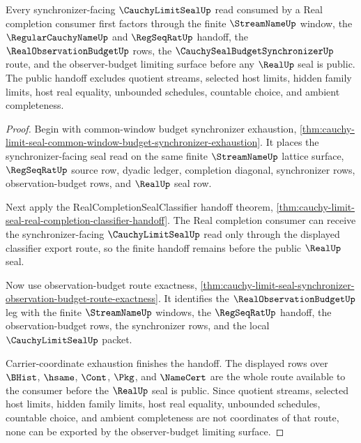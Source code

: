 \begin{theorem}
\label{thm:cauchy-limit-seal-observer-budget-handoff}
Every synchronizer-facing $\CauchyLimitSealUp$ read consumed by a Real completion consumer first factors through the finite $\StreamNameUp$ window, the $\RegularCauchyNameUp$ and $\RegSeqRatUp$ handoff, the $\RealObservationBudgetUp$ rows, the $\CauchySealBudgetSynchronizerUp$ route, and the observer-budget limiting surface before any $\RealUp$ seal is public. The public handoff excludes quotient streams, selected host limits, hidden family limits, host real equality, unbounded schedules, countable choice, and ambient completeness.
\end{theorem}
\begin{proof}
Begin with common-window budget synchronizer exhaustion, \autoref{thm:cauchy-limit-seal-common-window-budget-synchronizer-exhaustion}. It places the synchronizer-facing seal read on the same finite $\StreamNameUp$ lattice surface, $\RegSeqRatUp$ source row, dyadic ledger, completion diagonal, synchronizer rows, observation-budget rows, and $\RealUp$ seal row.

Next apply the RealCompletionSealClassifier handoff theorem, \autoref{thm:cauchy-limit-seal-real-completion-classifier-handoff}. The Real completion consumer can receive the synchronizer-facing $\CauchyLimitSealUp$ read only through the displayed classifier export route, so the finite handoff remains before the public $\RealUp$ seal.

Now use observation-budget route exactness, \autoref{thm:cauchy-limit-seal-synchronizer-observation-budget-route-exactness}. It identifies the $\RealObservationBudgetUp$ leg with the finite $\StreamNameUp$ windows, the $\RegSeqRatUp$ handoff, the observation-budget rows, the synchronizer rows, and the local $\CauchyLimitSealUp$ packet.

Carrier-coordinate exhaustion finishes the handoff. The displayed rows over $\BHist$, $\hsame$, $\Cont$, $\Pkg$, and $\NameCert$ are the whole route available to the consumer before the $\RealUp$ seal is public. Since quotient streams, selected host limits, hidden family limits, host real equality, unbounded schedules, countable choice, and ambient completeness are not coordinates of that route, none can be exported by the observer-budget limiting surface.
\end{proof}


